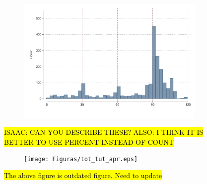\documentclass[oneside,11pt]{article}
\begin{document}
\begin{figure}[H]
\begin{center}
\begin{subfigure}{0.31\textwidth}
        \includegraphics[width=\textwidth]{Figuras/hist_payments_cc.pdf}
    \end{subfigure}    
    \end{center}
     \scriptsize
     \hl{ISAAC: CAN YOU DESCRIBE THESE? ALSO: I THINK IT IS BETTER TO USE PERCENT INSTEAD OF COUNT}
\end{figure}







\cleardoublepage







\cleardoublepage



\begin{figure}[H]
     \caption{ToT \& TuT as LATE}
    \label{tot_tut_graph}
    \begin{center}
    \begin{subfigure}{0.9\textwidth}
        \centering
        \texttt{[image: Figuras/tot\_tut\_apr.eps]}
    \end{subfigure}
    \end{center}
    \scriptsize
   \hl{The above figure is outdated figure. Need to update}
\end{figure}
\end{document}
